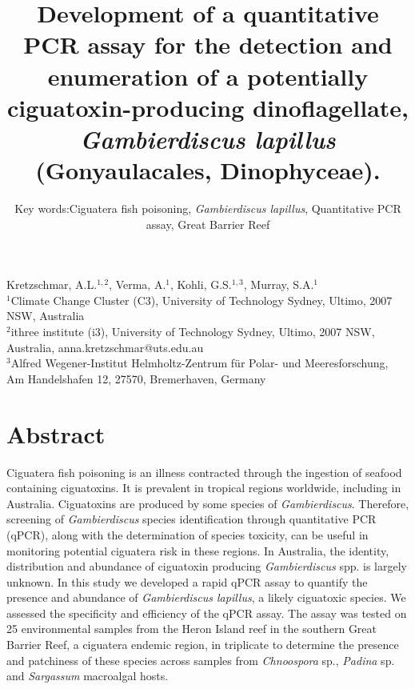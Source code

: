 \documentclass[12pt]{article}
\title{Development of a quantitative PCR assay for the detection and enumeration of a potentially ciguatoxin-producing dinoflagellate, \emph{Gambierdiscus lapillus} (Gonyaulacales, Dinophyceae).} %
\author{Key words:Ciguatera fish poisoning, \emph{Gambierdiscus lapillus}, Quantitative PCR assay, Great Barrier Reef}
\date{}
\begin{document}
\maketitle
Kretzschmar, A.L.$^{1,2}$, Verma, A.$^{1}$, Kohli, G.S.$^{1,3}$, Murray, S.A.$^{1}$\\
$^{1}$Climate Change Cluster (C3), University of Technology Sydney, Ultimo, 2007 NSW, Australia\\
$^{2}$ithree institute (i3), University of Technology Sydney, Ultimo, 2007 NSW, Australia, anna.kretzschmar@uts.edu.au\\
$^{3}$Alfred Wegener-Institut Helmholtz-Zentrum für Polar- und Meeresforschung, Am Handelshafen 12, 27570, Bremerhaven, Germany

\newpage
\section*{Abstract}
Ciguatera fish poisoning is an illness contracted through the ingestion of seafood containing ciguatoxins. 
It is prevalent in tropical regions worldwide, including in Australia. 
Ciguatoxins are produced by some species of \emph{Gambierdiscus}. 
Therefore, screening of \emph{Gambierdiscus} species identification through quantitative PCR (qPCR), along with the determination of species toxicity, can be useful in monitoring potential ciguatera risk in these regions. 
In Australia, the identity, distribution and abundance of ciguatoxin producing \textit{Gambierdiscus} spp. is largely unknown. 
In this study we developed a rapid qPCR assay to quantify the presence and abundance of \textit{Gambierdiscus lapillus}, a likely ciguatoxic species. %
We assessed the specificity and efficiency of the qPCR assay. %
The assay was tested on 25 environmental samples from the Heron Island reef in the southern Great Barrier Reef, a ciguatera endemic region, in triplicate to determine the presence and patchiness of these species across samples from \textit{Chnoospora} sp., \textit{Padina} sp. and \textit{Sargassum} macroalgal hosts.  


\newpage
\end{document}
